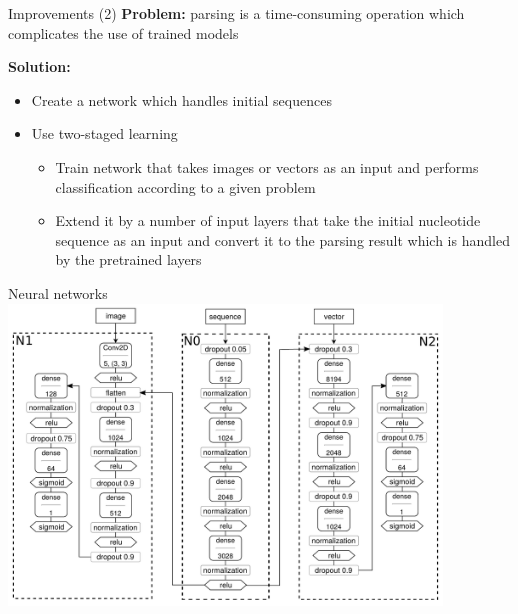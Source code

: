 \documentclass[xcolor=table]{beamer}
\begin{document}
\begin{frame}{Improvements (2)}
    \textbf{Problem:} parsing is a time-consuming operation which complicates the use of trained models
 
 \vspace{0.3cm}   
    \textbf{Solution:}
    \begin{itemize}
        \item Create a network which handles initial sequences
        \item Use two-staged learning
        \begin{itemize}
            \item Train network that takes images or vectors as an input and performs classification according to a given problem
            \item Extend it by a number of input layers that take the initial nucleotide sequence as an input and convert it to the parsing result which is handled by the pretrained layers
        \end{itemize}
    \end{itemize}
\end{frame}

\begin{frame}{Neural networks}
\includegraphics[width=11.5cm]{pictures/nn_arch.pdf}
\end{frame}
\end{document}

